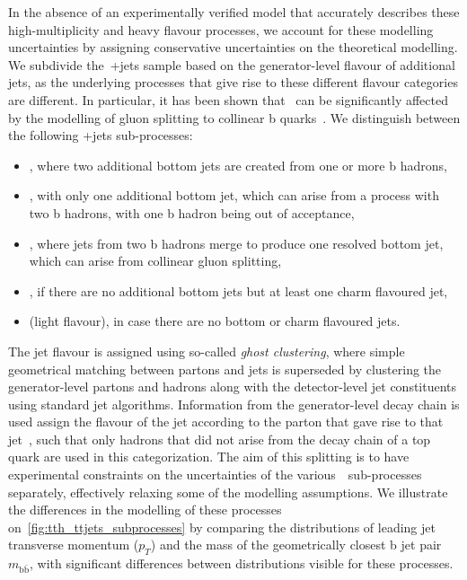 In the absence of an experimentally verified model that accurately describes these high-multiplicity and heavy flavour processes, we account for these modelling uncertainties by assigning conservative uncertainties on the theoretical modelling. We subdivide the~\ttbar+jets sample based on the generator-level flavour of additional jets, as the underlying processes that give rise to these different flavour categories are different. In particular, it has been shown that \ttbb~can be significantly affected by the modelling of gluon splitting to collinear b quarks~\cite{Cascioli:2013era}. We distinguish between the following \ttbar+jets sub-processes:
\begin{itemize}
\item \ttbb, where two additional bottom jets are created from one or more b hadrons,
\item \ttb, with only one additional bottom jet, which can arise from a process with two b hadrons, with one b hadron being out of acceptance,
\item \tttwob, where jets from two b hadrons merge to produce one resolved bottom jet, which can arise from collinear gluon splitting,
\item \ttcc, if there are no additional bottom jets but at least one charm flavoured jet,
\item \ttlf (light flavour), in case there are no bottom or charm flavoured jets.
\end{itemize}
The jet flavour is assigned using so-called \textit{ghost clustering}, where simple geometrical matching between partons and jets is superseded by clustering the generator-level partons and hadrons along with the detector-level jet constituents using standard jet algorithms. Information from the generator-level decay chain is used assign the flavour of the jet according to the parton that gave rise to that jet~\cite{Bartosik:2047049}, such that only hadrons that did not arise from the decay chain of a top quark are used in this categorization. The aim of this splitting is to have experimental constraints on the uncertainties of the various~\ttbar~sub-processes separately, effectively relaxing some of the modelling assumptions. We illustrate the differences in the modelling of these processes on~\cref{fig:tth_ttjets_subprocesses} by comparing the distributions of leading jet transverse momentum ($p_T$) and the mass of the geometrically closest b jet pair $m_{\mathrm{b\bar{b}}}$, with significant differences between distributions visible for these processes.

